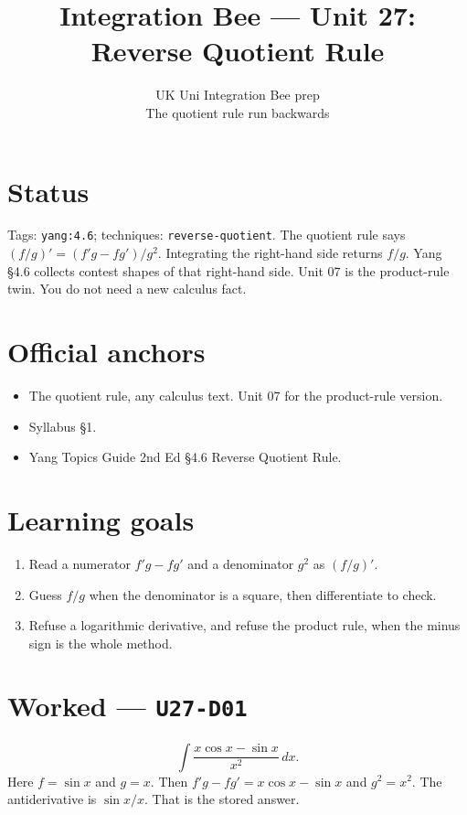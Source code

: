 
\title{Integration Bee --- Unit 27:\\ Reverse Quotient Rule}
\author{UK Uni Integration Bee prep\\ The quotient rule run backwards}
\date{}

\maketitle
\section*{Status}
Tags: \texttt{yang:4.6}; techniques: \texttt{reverse-quotient}.
The quotient rule says $(f/g)'=(f'g-fg')/g^2$. Integrating the right-hand side returns $f/g$. Yang \S4.6 collects contest shapes of that right-hand side. Unit 07 is the product-rule twin. You do not need a new calculus fact.
\section{Official anchors}
\begin{itemize}
\item The quotient rule, any calculus text. Unit 07 for the product-rule version.
\item Syllabus \S1.
\item Yang Topics Guide 2nd Ed \S4.6 Reverse Quotient Rule.
\end{itemize}
\section{Learning goals}
\begin{enumerate}
  \item Read a numerator $f'g-fg'$ and a denominator $g^2$ as $(f/g)'$.
  \item Guess $f/g$ when the denominator is a square, then differentiate to check.
  \item Refuse a logarithmic derivative, and refuse the product rule, when the minus sign is the whole method.
\end{enumerate}

\section{Worked --- \texttt{U27-D01}}
\[
\int\frac{x\cos x-\sin x}{x^2}\,dx.
\]
Here $f=\sin x$ and $g=x$. Then $f'g-fg'=x\cos x-\sin x$ and $g^2=x^2$. The antiderivative is $\sin x/x$. That is the stored answer.

